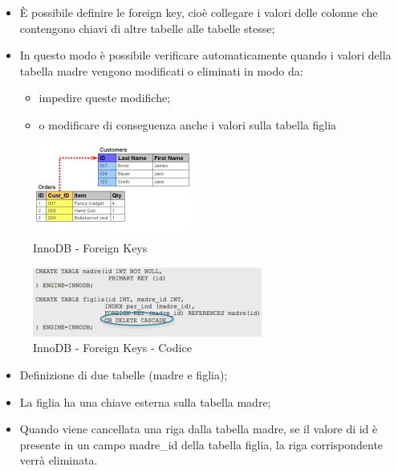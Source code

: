 \begin{itemize}

\item È possibile definire le foreign key, cioè collegare i valori delle colonne che contengono chiavi di altre tabelle alle tabelle stesse;
\item In questo modo è possibile verificare automaticamente quando i valori della tabella madre vengono modificati o eliminati in modo da:

\begin{itemize}

\item impedire queste modifiche;
\item o modificare di conseguenza anche i valori sulla tabella figlia
\end{itemize}

\end{itemize}

\begin{center}
\begin{figure}[H]
\centering
\includegraphics[scale=1]{figures/innoDB_fk.png}
\caption{InnoDB - Foreign Keys} 
\end{figure}
\end{center}

\begin{center}
\begin{figure}[H]
\centering
\includegraphics[scale=1]{figures/innoDB_fk_code.png}
\caption{InnoDB - Foreign Keys - Codice} 
\end{figure}
\end{center}

\begin{itemize}

\item Definizione di due tabelle (madre e figlia);
\item La figlia ha una chiave esterna sulla tabella madre;
\item Quando viene cancellata una riga dalla tabella madre, se il valore di id è presente in un campo madre\_id della tabella figlia, la riga corrispondente verrà eliminata.

\end{itemize}



